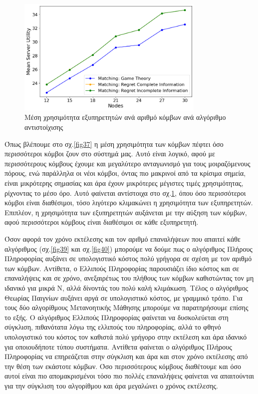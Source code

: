 \begin{figure}[H]
    \centering
    \includegraphics[width=0.8\textwidth]{figures/chapter4/Mean_Server_Utility_vs_Users.png}
    \caption{Μέση χρησιμότητα εξυπηρετητών ανά αριθμό κόμβων ανά αλγόριθμο αντιστοίχισης}
    \label{fig38}
\end{figure}

\newpage

Όπως βλέπουμε στο σχ.\ref{fig37} η μέση χρησιμότητα των κόμβων πέφτει όσο περισσότεροι κόμβοι ζουν στο σύστημά μας. Αυτό είναι λογικό, αφού με περισσότερους κόμβους έχουμε και μεγαλύτερο ανταγωνισμό για τους μοιραζόμενους πόρους, ενώ παράλληλα οι νέοι κόμβοι, όντας πιο μακρινοί από τα κρίσιμα σημεία, είναι μικρότερης σημασίας και άρα έχουν μικρότερες μέγιστες τιμές χρησιμότητας, ρίχνοντας το μέσο όρο. Αυτό φαίνεται αντίστοιχα στο σχ.\ref{fig38}, όπου όσο περισσότεροι κόμβοι είναι διαθέσιμοι, τόσο λιγότερο κλιμακώνει η χρησιμότητα των εξυπηρετητών. Επιπλέον, η χρησιμότητα των εξυπηρετητών αυξάνεται με την αύξηση των κόμβων, αφού περισσότεροι κόμβους είναι διαθέσιμοι σε κάθε εξυπηρετητή.

Όσον αφορά τον χρόνο εκτέλεσης και τον αριθμό επαναλήψεων που απαιτεί κάθε αλγόριθμος (σχ.\ref{fig39} και σχ.\ref{fig40}) μπορούμε να δούμε πως ο αλγόριθμος Πλήρους Πληροφορίας αυξάνει σε υπολογιστικό κόστος πολύ γρήγορα σε σχέση με τον αριθμό των κόμβων. Αντίθετα, ο Ελλιπούς Πληροφορίας παρουσιάζει ίδιο κόστος και σε επαναλήψεις και σε χρόνο, ανεξαιρέτως του πλήθους των κόμβων καθιστώντας τον μη ιδανικό για μικρά Ν, αλλά δίνοντάς του πολύ καλή κλιμάκωση.  Τέλος ο αλγόριθμος Θεωρίας Παιγνίων αυξάνει αργά σε υπολογιστικό κόστος, με γραμμικό τρόπο. Για τους δύο αλγορίθμους Μετανοητικής Μάθησης μπορούμε να παρατηρήσουμε επίσης το εξής. Ο αλγόριθμος Ελλιπούς Πληροφορίας φαίνεται να δυσκολεύεται στη σύγκλιση, πιθανότατα λόγω της ελλιπούς του πληροφορίας, αλλά το φθηνό υπολογιστικό του κόστος τον καθιστά πολύ γρήγορο στην εκτέλεση και άρα ιδανικό για οποιουδήποτε τύπου συστήματα. Αντίθετα φαίνεται ο αλγόριθμος Πλήρους Πληροφορίας να επηρεάζεται στην σύγκλιση και άρα και στον χρόνο εκτέλεσης από την θέση των εκάστοτε κόμβων. Όσο περισσότερους κόμβους διαθέτουμε και όσο αυτοί είναι πιο απομακρισμένοι τόσο πιο πολλές επαναλήψεις φαίνεται να απαιτούνται για την σύγκλιση του αλγορίθμου και άρα μεγαλώνει ο χρόνος εκτέλεσης.

